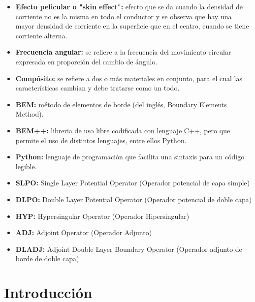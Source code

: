 \documentclass[12pt,letterpaper]{article}
\numberwithin{equation}{section}
\begin{document}
\begin{itemize}
	\item \textbf{Efecto pelicular o "skin effect":} efecto que se da cuando la densidad de corriente no es la misma en todo el conductor y se observa que hay una mayor densidad de corriente en la superficie que en el centro, cuando se tiene corriente alterna.
	\item \textbf{Frecuencia angular:} se refiere a la frecuencia del movimiento circular expresada en proporción del cambio de ángulo.
	\item \textbf{Compósito:} se refiere a dos o más materiales en conjunto, para el cual las características cambian y debe tratarse como un todo.
	\item \textbf{BEM:} método de elementos de borde (del inglés, Boundary Elements Method).
	\item \textbf{BEM++:} libreria de uso libre codificada con lenguaje C++, pero que permite el uso de distintos lenguajes, entre ellos Python.
	\item \textbf{Python:} lenguaje de programación que facilita una sintaxis para un código legible.
	
	\item \textbf{SLPO:} Single Layer Potential Operator (Operador potencial de capa simple)
	
	\item \textbf{DLPO:} Double Layer Potential Operator (Operador potencial de doble capa)
	
	\item \textbf{HYP:} Hypersingular Operator (Operador Hipersingular)
	
	\item \textbf{ADJ:} Adjoint Operator (Operador Adjunto)
	
	\item \textbf{DLADJ:} Adjoint Double Layer Boundary Operator (Operador adjunto de borde de doble capa) 
	

\end{itemize}

\pagebreak
\tableofcontents

\pagebreak
{}

\section{Introducción}
\end{document}
